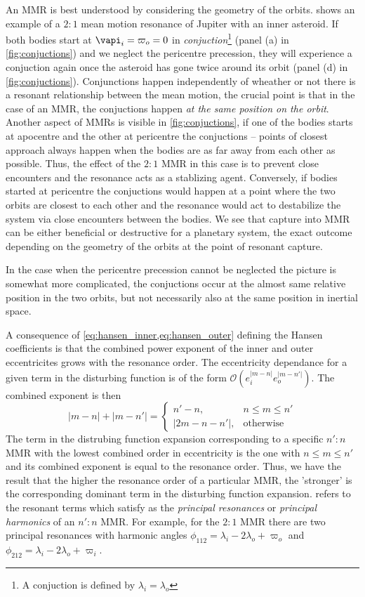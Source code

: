 An MMR is best understood by considering the geometry of the 
orbits.  shows an example of a $2:1$
mean motion resonance of Jupiter with an inner asteroid. 
If both bodies start at $\vapi_i=\varpi_o=0$ in 
\emph{conjuction}\footnote{A conjuction is defined by 
$\lambda_i=\lambda_o$} (panel (a) in \cref{fig:conjuctions}) and we 
neglect the pericentre precession, they will experience
a conjuction again once the asteroid has gone twice 
around its orbit (panel (d) in \cref{fig:conjuctions}). Conjunctions
happen independently of wheather or not there is a resonant
relationship between the mean motion, the crucial point
is that in the case of an MMR, the conjuctions happen
\emph{at the same position on the orbit}. Another aspect of MMRs
is visible in \cref{fig:conjuctions}, if one of the bodies starts
at apocentre and the other at pericentre the conjuctions --
points of closest approach always happen when the bodies 
are as far away from each other as possible. Thus, the effect
of the $2:1$ MMR in this case is to prevent close encounters and 
the resonance acts as a stablizing agent. Conversely, if bodies
started at pericentre the conjuctions would happen at a point 
where the two orbits are closest to each other and the resonance
would act to destabilize the system via close encounters between
the bodies. We see that capture into MMR can be either beneficial
or destructive for a planetary system, the exact outcome
depending on the geometry of the orbits at the point of resonant
capture. 

In the case when the pericentre precession cannot be neglected the
picture is somewhat more complicated, the conjuctions occur 
at the  almost same relative position in the two orbits, but not 
necessarily also at the same position in inertial space.

A consequence of \cref{eq:hansen_inner,eq:hansen_outer}
defining the Hansen coefficients
is that the combined power exponent of the inner and outer 
eccentricites 
grows with the resonance order. The eccentricity dependance
for a given term in the disturbing function 
is of the form $\mathcal{O}(e_i^{\lvert m-n\rvert}
e_o^{\lvert m-n'\rvert})$. The combined exponent is then
\begin{equation}
    \lvert m-n\rvert+\lvert m-n'\rvert=
    \begin{cases}
        n'-n, & n\leq m\leq n'\\
        \lvert 2m-n-n'\rvert, & \text{otherwise}
    \end{cases}
\end{equation}
The term in the distrubing function expansion corresponding
to a specific $n':n$ MMR with the lowest combined order
in eccentricity is the one with $n\leq m\leq n'$ and its
combined exponent is equal to the resonance order. Thus, we
have the result that the higher the resonance order of
a particular MMR, the 'stronger' is the corresponding dominant
term in the disturbing function expansion. \Cite{Mardling2013}
refers to the resonant terms which satisfy as the
\emph{principal resonances} or \emph{principal harmonics} 
of an $n':n$ MMR. For example, for the $2:1$ MMR there are two
principal resonances with harmonic angles $\phi_{112}=
\lambda_i-2\lambda_o+\varpi_o$ and $\phi_{212}=\lambda_i
-2\lambda_o+\varpi_i$.


